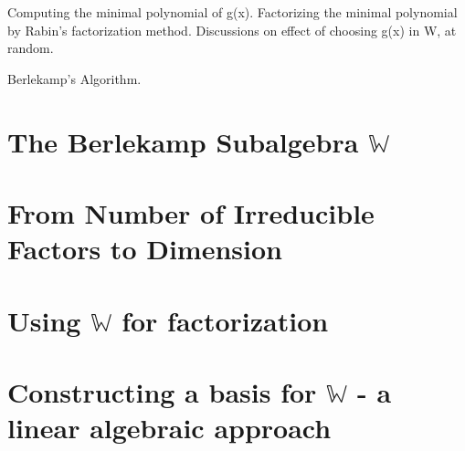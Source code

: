 
\noindent

Computing the minimal polynomial of g(x). Factorizing the minimal polynomial by Rabin's factorization method. Discussions on effect of choosing g(x) in W, at random.

Berlekamp's Algorithm.

\section{The Berlekamp Subalgebra $\mathbb{W}$}

\section{From Number of Irreducible Factors to Dimension}

\section{Using $\mathbb{W}$ for factorization}

\section{Constructing a basis for $\mathbb{W}$ - a linear algebraic approach}